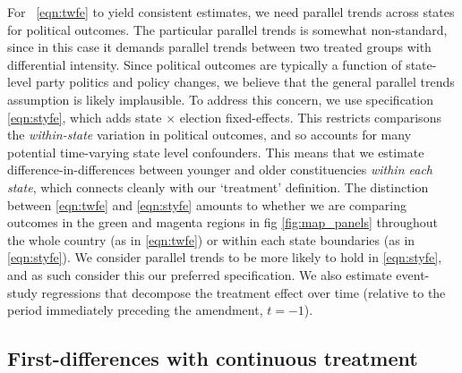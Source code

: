 For ~\ref{eqn:twfe} to yield consistent estimates, we need parallel
trends across states for political outcomes. The particular parallel
trends is somewhat non-standard, since in this case it demands
parallel trends between two treated groups with differential
intensity. Since political outcomes are typically a function of
state-level party politics and policy changes, we believe that the
general parallel trends assumption is likely implausible. To address
this concern, we use specification \ref{eqn:styfe}, which adds state
$\times$ election fixed-effects. This restricts comparisons the
\emph{within-state} variation in political outcomes, and so accounts
for many potential time-varying state level confounders. This means
that we estimate difference-in-differences between younger and older
constituencies \emph{within each state}, which connects cleanly with
our `treatment' definition. The distinction between \ref{eqn:twfe} and
\ref{eqn:styfe} amounts to whether we are comparing outcomes in the
green and magenta regions in fig \ref{fig:map_panels} throughout the
whole country (as in \ref{eqn:twfe}) or within each state boundaries
(as in \ref{eqn:styfe}). We consider parallel trends to be more likely
to hold in \ref{eqn:styfe}, and as such consider this our preferred
specification. We also estimate event-study regressions that decompose
the treatment effect over time (relative to the period immediately
preceding the amendment, $t = -1$).






\label{sec:res}


\subsection{First-differences with continuous treatment} %
\label{sub:first_differences_estimates}

